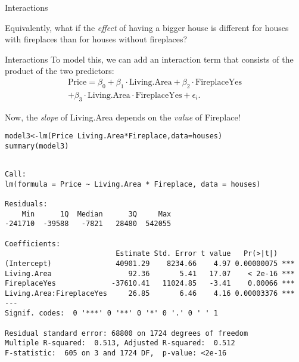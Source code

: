 \documentclass{beamer}\usepackage[]{graphicx}\usepackage[]{color}
\makeatletter
\newcommand{\hlopt}[1]{\textcolor[rgb]{1,0.894,0.769}{#1}}%
\newcommand{\hlstd}[1]{\textcolor[rgb]{1,0.894,0.769}{#1}}%
\newcommand{\hlkwb}[1]{\textcolor[rgb]{0.804,0.776,0.451}{#1}}%
\newcommand{\hlkwc}[1]{\textcolor[rgb]{0.78,0.941,0.545}{#1}}%
\newcommand{\hlkwd}[1]{\textcolor[rgb]{1,0.78,0.769}{#1}}%
\newenvironment{kframe}{%
 \def\at@end@of@kframe{}%
 \ifinner\ifhmode%
  \def\at@end@of@kframe{\end{minipage}}%
  \begin{minipage}{\columnwidth}%
 \fi\fi%
 \def\FrameCommand##1{\hskip\@totalleftmargin \hskip-\fboxsep
 \colorbox{shadecolor}{##1}\hskip-\fboxsep
     \hskip-\linewidth \hskip-\@totalleftmargin \hskip\columnwidth}%
 \MakeFramed {\advance\hsize-\width
   \@totalleftmargin\z@ \linewidth\hsize
   \@setminipage}}%
 {\par\unskip\endMakeFramed%
 \at@end@of@kframe}
\newenvironment{knitrout}{}{} %
\makeatother
\begin{document}
\begin{darkframes}
\begin{frame}{Interactions}
\begin{center}
        \bigskip\pause

        Equivalently, what if the \emph{effect} of having a bigger house is different for houses with fireplaces than for houses without fireplaces?
      \end{center}
    \end{frame}
    
    \begin{frame}{Interactions}
      To model this, we can add an \alert{interaction term} that consists of the product of the two predictors:
      \begin{multline*}
        \text{Price} = \beta_0 + \beta_1\cdot\text{Living.Area} + \beta_2\cdot\text{FireplaceYes}
        \\ + \beta_3\cdot\text{Living.Area}\cdot\text{FireplaceYes} + \epsilon_i.
      \end{multline*}

      \pause\bigskip

      Now, the \emph{slope} of Living.Area depends on the \emph{value} of Fireplace!
    \end{frame}

    \begin{frame}[fragile]
      \fontsize{8}{8}\selectfont
\begin{knitrout}
\begin{kframe}
\begin{alltt}
\hlstd{model3} \hlkwb{<-} \hlkwd{lm}\hlstd{(Price} \hlopt{~} \hlstd{Living.Area} \hlopt{*} \hlstd{Fireplace,} \hlkwc{data}\hlstd{=houses)}
\hlkwd{summary}\hlstd{(model3)}
\end{alltt}
\begin{verbatim}

Call:
lm(formula = Price ~ Living.Area * Fireplace, data = houses)

Residuals:
    Min      1Q  Median      3Q     Max 
-241710  -39588   -7821   28480  542055 

Coefficients:
                          Estimate Std. Error t value   Pr(>|t|)    
(Intercept)               40901.29    8234.66    4.97 0.00000075 ***
Living.Area                  92.36       5.41   17.07    < 2e-16 ***
FireplaceYes             -37610.41   11024.85   -3.41    0.00066 ***
Living.Area:FireplaceYes     26.85       6.46    4.16 0.00003376 ***
---
Signif. codes:  0 '***' 0 '**' 0 '*' 0 '.' 0 ' ' 1

Residual standard error: 68800 on 1724 degrees of freedom
Multiple R-squared:  0.513,	Adjusted R-squared:  0.512 
F-statistic:  605 on 3 and 1724 DF,  p-value: <2e-16
\end{verbatim}
\end{kframe}
\end{knitrout}
    \end{frame}


\end{darkframes}
\end{document}
